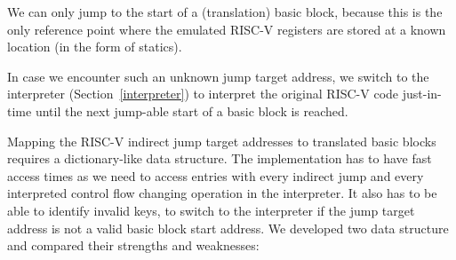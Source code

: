\documentclass[course=eragp]{aspdoc}
\begin{document}
We can only jump to the start of a (translation) basic block, because this is the only reference point where the
emulated RISC-V registers are stored at a known location (in the form of statics).

In case we encounter such an unknown jump target address, we switch to the interpreter (Section~\ref{interpreter}) to
interpret the original RISC-V code just-in-time until the next jump-able start of a basic block is reached.

\par

Mapping the RISC-V indirect jump target addresses to translated basic blocks requires a
dictionary-like data structure.
The implementation has to have fast access times as we need to access entries with
every indirect jump and every interpreted control flow changing operation in the interpreter. It also has to be able
to identify invalid keys, to switch to the interpreter if the
jump target address is not a valid basic block start address. We developed two data structure and
compared their strengths and weaknesses:
\end{document}
